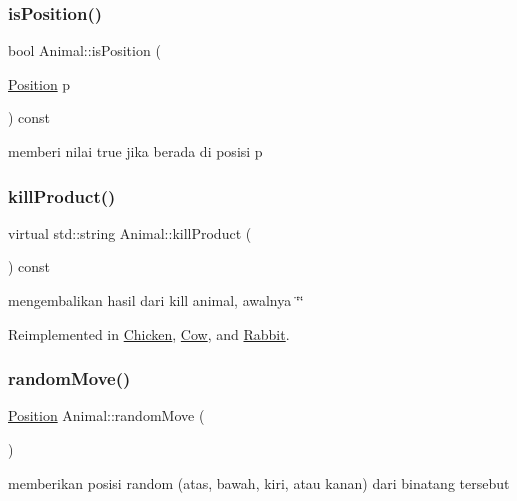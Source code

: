 \subsubsection{\texorpdfstring{isPosition()}{isPosition()}}
{\footnotesize\ttfamily bool Animal\+::is\+Position (\begin{DoxyParamCaption}\item[{\mbox{\hyperlink{class_position}{Position}}}]{p }\end{DoxyParamCaption}) const}

memberi nilai true jika berada di posisi p \mbox{\label{class_animal_a4d4e70aed7f889574600e8492f419948}} 
\subsubsection{\texorpdfstring{killProduct()}{killProduct()}}
{\footnotesize\ttfamily virtual std\+::string Animal\+::kill\+Product (\begin{DoxyParamCaption}{ }\end{DoxyParamCaption}) const\hspace{0.3cm}{\ttfamily [virtual]}}

mengembalikan hasil dari kill animal, awalnya \char`\"{}\char`\"{} 

Reimplemented in \mbox{\hyperlink{class_chicken_a31c3c1a46d657c0bfa45de825dc06e53}{Chicken}}, \mbox{\hyperlink{class_cow_a063e4f8d17216c2cdb4b967d508e1c92}{Cow}}, and \mbox{\hyperlink{class_rabbit_a982b868df58d7ad6e7b4814f5fbe1473}{Rabbit}}.

\mbox{\label{class_animal_a5c2c38bed13b17bbfd553c2a09bbfb6d}} 
\subsubsection{\texorpdfstring{randomMove()}{randomMove()}}
{\footnotesize\ttfamily \mbox{\hyperlink{class_position}{Position}} Animal\+::random\+Move (\begin{DoxyParamCaption}{ }\end{DoxyParamCaption})}

memberikan posisi random (atas, bawah, kiri, atau kanan) dari binatang tersebut \mbox{\label{class_animal_a45299ed726067b2e1903ea09028a526d}} 
